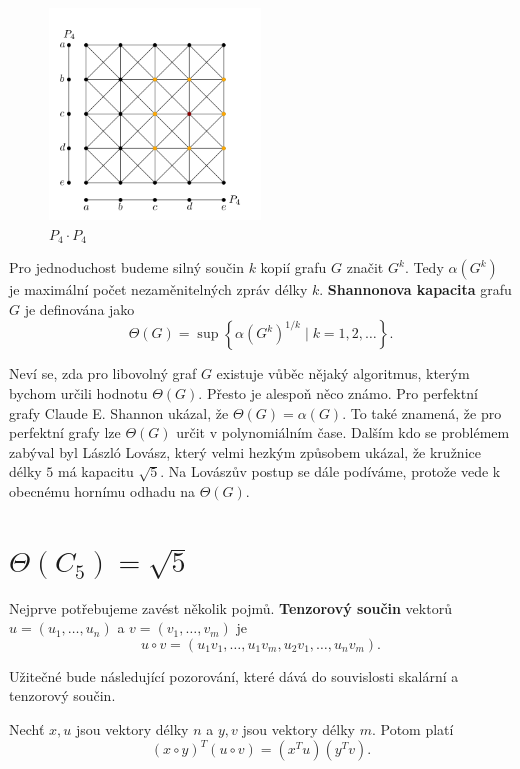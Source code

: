 \begin{figure}[h!]
    \centering
    \includegraphics[width=0.5\textwidth]{img/strong_product_P4_P4.png}   
    \caption{$P_4 \cdot P_4$}
    \label{fig:strong_product_P4_P4}
\end{figure}

Pro jednoduchost budeme silný součin $k$ kopií grafu $G$ značit $G^k$. Tedy $\alpha(G^k)$ je maximální počet nezaměnitelných zpráv délky $k$. \textbf{Shannonova kapacita} grafu $G$ je definována jako
$$
    \Theta(G) = \sup \left\{ \alpha(G^k)^{1/k} \mid k = 1, 2, \dots \right\}.
$$

Neví se, zda pro libovolný graf $G$ existuje vůběc nějaký algoritmus, kterým bychom určili hodnotu $\Theta(G)$. Přesto je alespoň něco známo. Pro perfektní grafy Claude E. Shannon ukázal, že $\Theta(G) = \alpha(G)$. To také znamená, že pro perfektní grafy lze $\Theta(G)$ určit v polynomiálním čase. Dalším kdo se problémem zabýval byl László Lovász, který velmi hezkým způsobem ukázal, že kružnice délky $5$ má kapacitu $\sqrt{5}$. Na Lovászův postup se dále podíváme, protože vede k obecnému hornímu odhadu na $\Theta(G)$.

\section{$\Theta(C_5) = \sqrt{5}$}

Nejprve potřebujeme zavést několik pojmů. \textbf{Tenzorový součin} vektorů $u = \left(u_1, \dots, u_n \right)$ a $v = \left(v_1, \dots, v_m \right)$ je
$$
    u \circ v = \left( u_1 v_1, \dots, u_1 v_m, u_2 v_1, \dots, u_n v_m \right).
$$

Užitečné bude následující pozorování, které dává do souvislosti skalární a tenzorový součin.

\begin{pz}
    Nechť $x, u$ jsou vektory délky $n$ a $y, v$ jsou vektory délky $m$. Potom platí
    \begin{equation}
        \left( x \circ y \right)^T \left( u \circ v \right) = \left( x^T u \right) \left( y^T v \right).
        \label{eq:tensor_scalar_product}
    \end{equation}
\end{pz}

